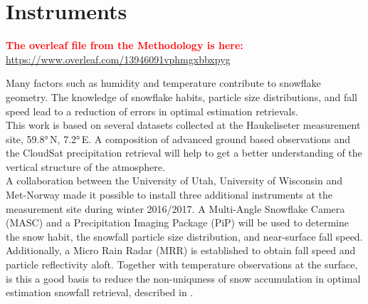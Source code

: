 \chapter{Instruments} \label{ch:DIM}
\textcolor{red}{\textbf{The overleaf file from the Methodology is here:} \\ \url{https://www.overleaf.com/13946091vphmgxbbxpyg}}

Many factors such as humidity and temperature contribute to snowflake geometry. The knowledge of snowflake habits, particle size distributions, and fall speed lead to a reduction of errors in optimal estimation retrievals. \\
This work is based on several datasets collected at the Haukeliseter measurement site, \ang{59.8}\,N, \ang{7.2}\,E. A composition of advanced ground based observations and the CloudSat precipitation retrieval will help to get a better understanding of the vertical structure of the atmosphere. 
\\
A collaboration between the University of Utah, University of Wisconsin and Met-Norway made it possible to install three additional instruments at the measurement site during winter 2016/2017. A Multi-Angle Snowflake Camera (MASC) and a Precipitation Imaging Package (PiP) will be used to determine the snow habit, the snowfall particle size distribution, and near-surface fall speed. Additionally, a Micro Rain Radar (MRR) is established to obtain fall speed and particle reflectivity aloft. Together with temperature observations at the surface, is this a good basis to reduce the non-uniquness of snow accumulation in optimal estimation snowfall retrieval, described in . 
%
%
\pagebreak
